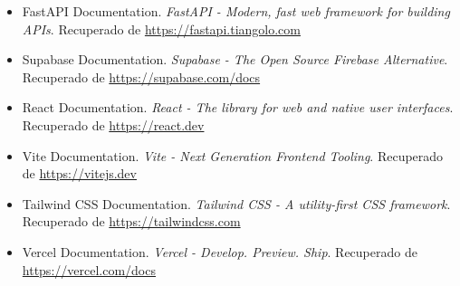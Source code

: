 \documentclass[12pt,a4paper]{article}
\begin{document}
	\begin{itemize}
	\item FastAPI Documentation. \textit{FastAPI - Modern, fast web framework for building APIs}. Recuperado de \url{https://fastapi.tiangolo.com}
	\item Supabase Documentation. \textit{Supabase - The Open Source Firebase Alternative}. Recuperado de \url{https://supabase.com/docs}
	\item React Documentation. \textit{React - The library for web and native user interfaces}. Recuperado de \url{https://react.dev}
	\item Vite Documentation. \textit{Vite - Next Generation Frontend Tooling}. Recuperado de \url{https://vitejs.dev}
	\item Tailwind CSS Documentation. \textit{Tailwind CSS - A utility-first CSS framework}. Recuperado de \url{https://tailwindcss.com}
	\item Vercel Documentation. \textit{Vercel - Develop. Preview. Ship}. Recuperado de \url{https://vercel.com/docs}
	\end{itemize}
\end{document}
